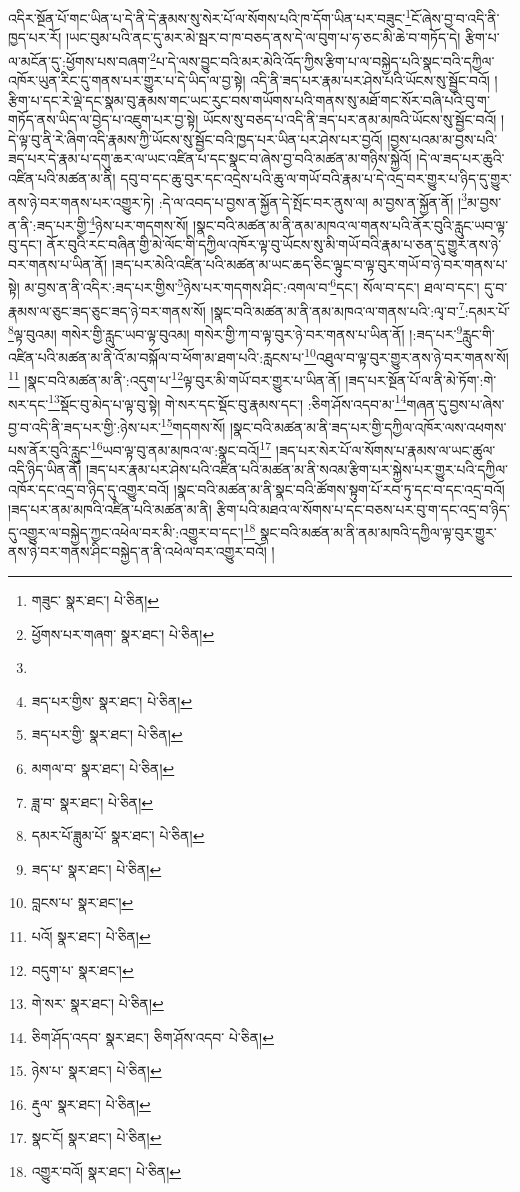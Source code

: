 འདིར་སྔོན་པོ་གང་ཡིན་པ་དེ་ནི་དེ་རྣམས་སུ་སེར་པོ་ལ་སོགས་པའི་ཁ་དོག་ཡིན་པར་བཟུང་\footnote{གཟུང་  སྣར་ཐང་།  པེ་ཅིན། }ངོ་ཞེས་བྱ་བ་འདི་ནི་ཁྱད་པར་རོ། །ཡང་བུམ་པའི་ནང་དུ་མར་མེ་སྦར་བ་ཁ་བཅད་ནས་དེ་ལ་བུག་པ་ཧ་ཅང་མི་ཆེ་བ་གཏོད་དེ། རྩིག་པ་ལ་མངོན་དུ་:ཕྱོགས་པས་བཞག་\footnote{ཕྱོགས་པར་གཞག་  སྣར་ཐང་།  པེ་ཅིན། }པ་དེ་ལས་བྱུང་བའི་མར་མེའི་འོད་ཀྱིས་རྩིག་པ་ལ་བསྐྱེད་པའི་སྣང་བའི་དཀྱིལ་འཁོར་ཡུན་རིང་དུ་གནས་པར་གྱུར་པ་དེ་ཡིད་ལ་བྱ་སྟེ། འདི་ནི་ཟད་པར་རྣམ་པར་ཤེས་པའི་ཡོངས་སུ་སྦྱོང་བའོ། །རྩིག་པ་དང་རེ་ལྡེ་དང་སྣམ་བུ་རྣམས་གང་ཡང་རུང་བས་གཡོགས་པའི་གནས་སུ་མཐོ་གང་སོར་བཞི་པའི་བུ་ག་གཏོད་ནས་ཡིད་ལ་བྱེད་པ་འཇུག་པར་བྱ་སྟེ། ཡོངས་སུ་བཅད་པ་འདི་ནི་ཟད་པར་ནམ་མཁའི་ཡོངས་སུ་སྦྱོང་བའོ། །དེ་ལྟ་བུ་ནི་རེ་ཞིག་འདི་རྣམས་ཀྱི་ཡོངས་སུ་སྦྱོང་བའི་ཁྱད་པར་ཡིན་པར་ཤེས་པར་བྱའོ། །བྱས་པའམ་མ་བྱས་པའི་ཟད་པར་དེ་རྣམ་པ་དགུ་ཆར་ལ་ཡང་འཛིན་པ་དང་སྣང་བ་ཞེས་བྱ་བའི་མཚན་མ་གཉིས་སྐྱེའོ། །དེ་ལ་ཟད་པར་ཆུའི་འཛིན་པའི་མཚན་མ་ནི། དབུ་བ་དང་ཆུ་བུར་དང་འདྲེས་པའི་ཆུ་ལ་གཡོ་བའི་རྣམ་པ་དེ་འདྲ་བར་གྱུར་པ་ཉིད་དུ་གྱུར་ནས་ཉེ་བར་གནས་པར་འགྱུར་ཏེ། :དེ་ལ་འབད་པ་བྱས་ན་སྐྱོན་དེ་སྤོང་བར་ནུས་ལ། མ་བྱས་ན་སྐྱོན་ནོ། །\footnote{}མ་བྱས་ན་ནི་:ཟད་པར་གྱི་\footnote{ཟད་པར་གྱིས་  སྣར་ཐང་།  པེ་ཅིན། }ཉེས་པར་གདགས་སོ། །སྣང་བའི་མཚན་མ་ནི་ནམ་མཁའ་ལ་གནས་པའི་ནོར་བུའི་རླུང་ཡབ་ལྟ་བུ་དང་། ནོར་བུའི་རང་བཞིན་གྱི་མེ་ལོང་གི་དཀྱིལ་འཁོར་ལྟ་བུ་ཡོངས་སུ་མི་གཡོ་བའི་རྣམ་པ་ཅན་དུ་གྱུར་ནས་ཉེ་བར་གནས་པ་ཡིན་ནོ། །ཟད་པར་མེའི་འཛིན་པའི་མཚན་མ་ཡང་ཆད་ཅིང་ལྟུང་བ་ལྟ་བུར་གཡོ་བ་ཉེ་བར་གནས་པ་སྟེ། མ་བྱས་ན་ནི་འདིར་:ཟད་པར་གྱིས་\footnote{ཟད་པར་གྱི་  སྣར་ཐང་།  པེ་ཅིན། }ཉེས་པར་གདགས་ཤིང་:འགལ་བ་\footnote{མགལ་བ་  སྣར་ཐང་།  པེ་ཅིན། }དང་། སོལ་བ་དང་། ཐལ་བ་དང་། དུ་བ་རྣམས་ལ་ཅུང་ཟད་ཅུང་ཟད་ཉེ་བར་གནས་སོ། །སྣང་བའི་མཚན་མ་ནི་ནམ་མཁའ་ལ་གནས་པའི་:ལྭ་བ་\footnote{ཟླ་བ་  སྣར་ཐང་།  པེ་ཅིན། }:དམར་པོ་\footnote{དམར་པོ་ཟླུམ་པོ་  སྣར་ཐང་།  པེ་ཅིན། }ལྟ་བུའམ། གསེར་གྱི་རླུང་ཡབ་ལྟ་བུའམ། གསེར་གྱི་ཀ་བ་ལྟ་བུར་ཉེ་བར་གནས་པ་ཡིན་ནོ། །:ཟད་པར་\footnote{ཟད་པ་  སྣར་ཐང་།  པེ་ཅིན། }རླུང་གི་འཛིན་པའི་མཚན་མ་ནི་འོ་མ་བསྐོལ་བ་ཕོག་མ་ཐག་པའི་:རླངས་པ་\footnote{བླངས་པ་  སྣར་ཐང་། }འཐུལ་བ་ལྟ་བུར་གྱུར་ནས་ཉེ་བར་གནས་སོ།\footnote{པའོ།  སྣར་ཐང་།  པེ་ཅིན། } །སྣང་བའི་མཚན་མ་ནི་:འདུག་པ་\footnote{བདུག་པ་  སྣར་ཐང་། }ལྟ་བུར་མི་གཡོ་བར་གྱུར་པ་ཡིན་ནོ། །ཟད་པར་སྔོན་པོ་ལ་ནི་མེ་ཏོག་:གེ་སར་དང་\footnote{གེ་སར་  སྣར་ཐང་།  པེ་ཅིན། }སྡོང་བུ་མེད་པ་ལྟ་བུ་སྟེ། གེ་སར་དང་སྡོང་བུ་རྣམས་དང་། :ཅིག་ཤོས་འདབ་མ་\footnote{ཅིག་ཤོད་འདབ་  སྣར་ཐང་། ཅིག་ཤོས་འདབ་  པེ་ཅིན། }གཞན་དུ་བྱས་པ་ཞེས་བྱ་བ་འདི་ནི་ཟད་པར་གྱི་:ཉེས་པར་\footnote{ཉེས་པ་  སྣར་ཐང་།  པེ་ཅིན། }གདགས་སོ། །སྣང་བའི་མཚན་མ་ནི་ཟད་པར་གྱི་དཀྱིལ་འཁོར་ལས་འཕགས་པས་ནོར་བུའི་རླུང་\footnote{རྡུལ་  སྣར་ཐང་།  པེ་ཅིན། }ཡབ་ལྟ་བུ་ནམ་མཁའ་ལ་:སྣང་བའོ།\footnote{སྣང་ངོ།  སྣར་ཐང་།  པེ་ཅིན། } །ཟད་པར་སེར་པོ་ལ་སོགས་པ་རྣམས་ལ་ཡང་ཚུལ་འདི་ཉིད་ཡིན་ནོ། །ཟད་པར་རྣམ་པར་ཤེས་པའི་འཛིན་པའི་མཚན་མ་ནི་སའམ་རྩིག་པར་སྐྱེས་པར་གྱུར་པའི་དཀྱིལ་འཁོར་དང་འདྲ་བ་ཉིད་དུ་འགྱུར་བའོ། །སྣང་བའི་མཚན་མ་ནི་སྣང་བའི་ཚོགས་སྟུག་པོ་རབ་ཏུ་དང་བ་དང་འདྲ་བའོ། །ཟད་པར་ནམ་མཁའི་འཛིན་པའི་མཚན་མ་ནི། རྩིག་པའི་མཐའ་ལ་སོགས་པ་དང་བཅས་པར་བུ་ག་དང་འདྲ་བ་ཉིད་དུ་འགྱུར་ལ་བསྐྱེད་ཀྱང་འཕེལ་བར་མི་:འགྱུར་བ་དང་།\footnote{འགྱུར་བའོ།  སྣར་ཐང་།  པེ་ཅིན། } སྣང་བའི་མཚན་མ་ནི་ནམ་མཁའི་དཀྱིལ་ལྟ་བུར་གྱུར་ནས་ཉེ་བར་གནས་ཤིང་བསྐྱེད་ན་ནི་འཕེལ་བར་འགྱུར་བའོ། །
